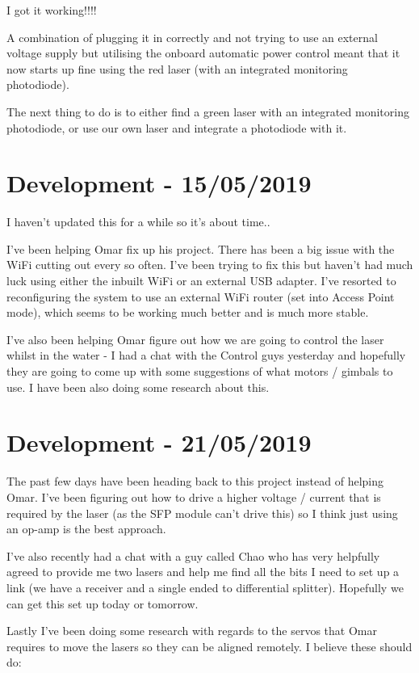 I got it working!!!!

A combination of plugging it in correctly and not trying to use an external
voltage supply but utilising the onboard automatic power control meant that
it now starts up fine using the red laser (with an integrated monitoring
photodiode).

The next thing to do is to either find a green laser with an integrated
monitoring photodiode, or use our own laser and integrate a photodiode with
it.

\section{Development - 15/05/2019}
I haven't updated this for a while so it's about time..

I've been helping Omar fix up his project. There has been a big issue with
the WiFi cutting out every so often. I've been trying to fix this but haven't
had much luck using either the inbuilt WiFi or an external USB adapter. I've
resorted to reconfiguring the system to use an external WiFi router (set into
Access Point mode), which seems to be working much better and is much more
stable.

I've also been helping Omar figure out how we are going to control the laser
whilst in the water - I had a chat with the Control guys yesterday and hopefully
they are going to come up with some suggestions of what motors / gimbals to use.
I have been also doing some research about this.

\section{Development - 21/05/2019}
The past few days have been heading back to this project instead of helping
Omar. I've been figuring out how to drive a higher voltage / current that
is required by the laser (as the \ac{SFP} module can't drive this) so I think
just using an op-amp is the best approach.

I've also recently had a chat with a guy called Chao who has very helpfully
agreed to provide me two lasers and help me find all the bits I need to set
up a link (we have a receiver and a single ended to differential splitter).
Hopefully we can get this set up today or tomorrow.

Lastly I've been doing some research with regards to the servos that Omar
requires to move the lasers so they can be aligned remotely. I believe these
should do:

